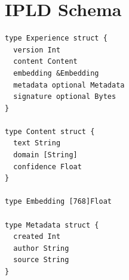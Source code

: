 \documentclass[11pt,letterpaper]{article}
\begin{document}
\section{IPLD Schema}

\begin{lstlisting}[caption=IPLD Schema Definition]
type Experience struct {
  version Int
  content Content
  embedding &Embedding
  metadata optional Metadata
  signature optional Bytes
}

type Content struct {
  text String
  domain [String]
  confidence Float
}

type Embedding [768]Float

type Metadata struct {
  created Int
  author String
  source String
}
\end{lstlisting}
\end{document}
